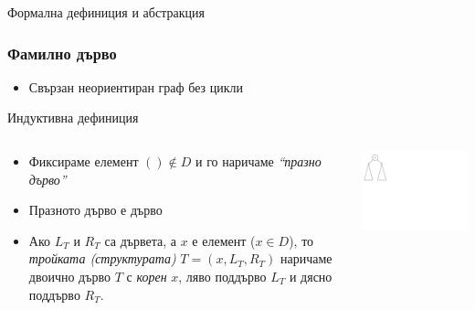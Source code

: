 \documentclass{beamer}
\begin{document}
\begin{frame}
\centerline{Формална дефиниция и абстракция}
\end{frame}




\begin{frame}[fragile]
\frametitle{Фамилно дърво}

    \begin{itemize}
      \item Свързан неориентиран граф без цикли 
    \end{itemize}

    \vspace{1em}
     Индуктивна дефиниция
    \vspace{1em}

\begin{columns}[t]
  \begin{column}{0.65\textwidth}


    \begin{itemize}
      \item Фиксираме елемент $() \notin D$ и го наричаме \emph{``празно дърво''}
      \item Празното дърво е дърво 
      \item Ако $L_T$ и $R_T$ са дървета, а $x$ е елемент ($x \in D$), то \emph{тройката (структурата)} $T=(x,L_T,R_T)$ наричаме двоично дърво $T$ с \emph{корен} $x$, ляво поддърво $L_T$ и дясно поддърво $R_T$.
    \end{itemize}

  \end{column}
  \begin{column}{0.35\textwidth}

    \includegraphics[width=9cm]{images/tree_recursive}

  \end{column}
\end{columns}


\end{frame}
\end{document}
